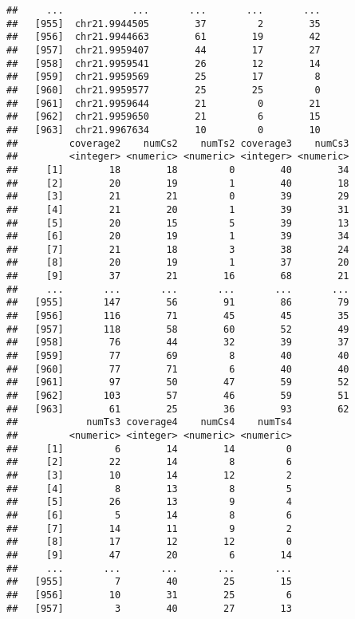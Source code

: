 \documentclass{article}
\makeatletter
\newenvironment{kframe}{%
 \def\FrameCommand##1{\hskip\@totalleftmargin \hskip-\fboxsep
 \colorbox{shadecolor}{##1}\hskip-\fboxsep
     \hskip-\linewidth \hskip-\@totalleftmargin \hskip\columnwidth}%
 \MakeFramed {\advance\hsize-\width
   \@totalleftmargin\z@ \linewidth\hsize
   \@setminipage}}%
 {\par\unskip\endMakeFramed}
\newenvironment{knitrout}{}{} %
\makeatother
\begin{document}
\begin{knitrout}
\begin{kframe}
\begin{verbatim}
##     ...            ...       ...       ...       ...
##   [955]  chr21.9944505        37         2        35
##   [956]  chr21.9944663        61        19        42
##   [957]  chr21.9959407        44        17        27
##   [958]  chr21.9959541        26        12        14
##   [959]  chr21.9959569        25        17         8
##   [960]  chr21.9959577        25        25         0
##   [961]  chr21.9959644        21         0        21
##   [962]  chr21.9959650        21         6        15
##   [963]  chr21.9967634        10         0        10
##         coverage2    numCs2    numTs2 coverage3    numCs3
##         <integer> <numeric> <numeric> <integer> <numeric>
##     [1]        18        18         0        40        34
##     [2]        20        19         1        40        18
##     [3]        21        21         0        39        29
##     [4]        21        20         1        39        31
##     [5]        20        15         5        39        13
##     [6]        20        19         1        39        34
##     [7]        21        18         3        38        24
##     [8]        20        19         1        37        20
##     [9]        37        21        16        68        21
##     ...       ...       ...       ...       ...       ...
##   [955]       147        56        91        86        79
##   [956]       116        71        45        45        35
##   [957]       118        58        60        52        49
##   [958]        76        44        32        39        37
##   [959]        77        69         8        40        40
##   [960]        77        71         6        40        40
##   [961]        97        50        47        59        52
##   [962]       103        57        46        59        51
##   [963]        61        25        36        93        62
##            numTs3 coverage4    numCs4    numTs4
##         <numeric> <integer> <numeric> <numeric>
##     [1]         6        14        14         0
##     [2]        22        14         8         6
##     [3]        10        14        12         2
##     [4]         8        13         8         5
##     [5]        26        13         9         4
##     [6]         5        14         8         6
##     [7]        14        11         9         2
##     [8]        17        12        12         0
##     [9]        47        20         6        14
##     ...       ...       ...       ...       ...
##   [955]         7        40        25        15
##   [956]        10        31        25         6
##   [957]         3        40        27        13

\end{verbatim}
\end{kframe}
\end{knitrout}
\end{document}

